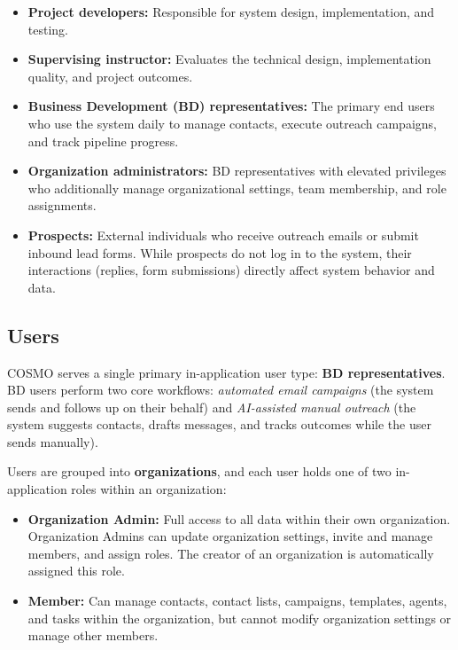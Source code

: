 \documentclass[a4paper]{article}
\begin{document}
\begin{itemize}
  \item \textbf{Project developers:} Responsible for system design, 
  implementation, and testing.
  
  \item \textbf{Supervising instructor:} Evaluates the technical 
  design, implementation quality, and project outcomes.
  
  \item \textbf{Business Development (BD) representatives:} The 
  primary end users who use the system daily to manage contacts, 
  execute outreach campaigns, and track pipeline progress.
  
  \item \textbf{Organization administrators:} BD representatives 
  with elevated privileges who additionally manage organizational 
  settings, team membership, and role assignments.
  
  \item \textbf{Prospects:} External individuals who receive 
  outreach emails or submit inbound lead forms. While prospects do 
  not log in to the system, their interactions (replies, form 
  submissions) directly affect system behavior and data.
\end{itemize}

\subsection{Users}

COSMO serves a single primary in-application user type: 
\textbf{BD representatives}. BD users perform two core workflows: 
\emph{automated email campaigns} (the system sends and follows up 
on their behalf) and \emph{AI-assisted manual outreach} (the 
system suggests contacts, drafts messages, and tracks outcomes 
while the user sends manually).

Users are grouped into \textbf{organizations}, and each user 
holds one of two in-application roles within an organization:

\begin{itemize}
  \item \textbf{Organization Admin:} Full access to all data 
  within their own organization. Organization Admins can update 
  organization settings, invite and manage members, and assign 
  roles. The creator of an organization is automatically assigned 
  this role.
  
  \item \textbf{Member:} Can manage contacts, contact lists, 
  campaigns, templates, agents, and tasks within the organization, 
  but cannot modify organization settings or manage other members.
\end{itemize}
\end{document}
